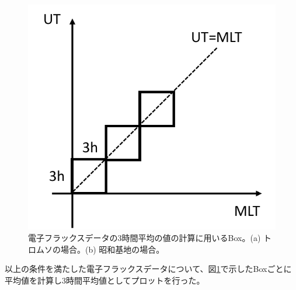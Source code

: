 \begin{enumerate}
\begin{figure}[htbp]
\begin{minipage}{.495\linewidth}
        \end{minipage}
        \begin{minipage}{.495\linewidth}
            \centering
            \includegraphics[scale=0.5]{master_thesis_contents/master_thesis_fig/app_poes_box_syowa.pdf}
        \end{minipage}
        \caption{電子フラックスデータの3時間平均の値の計算に用いるBox。(a) トロムソの場合。(b) 昭和基地の場合。}
        \label{fig:app_poes_box}
    \end{figure}
\end{enumerate} \par
以上の条件を満たした電子フラックスデータについて、図\ref{fig:app_poes_box}で示したBoxごとに平均値を計算し3時間平均値としてプロットを行った。

